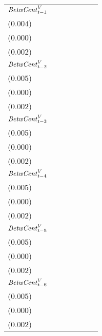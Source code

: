 \begin{tabular}{lllllll}
${\it BetwCent}^V_{t-1}$   &      \makecell{$0.001^{}$ \\ ($0.004$)} &     \makecell{$-0.000^{}$ \\ ($0.000$)} &   \makecell{$0.571^{***}$ \\ ($0.002$)} &                             \makecell{} &                             \makecell{} &                             \makecell{} \\
${\it BetwCent}^V_{t-2}$   &   \makecell{$-0.010^{**}$ \\ ($0.005$)} &      \makecell{$0.000^{}$ \\ ($0.000$)} &   \makecell{$0.208^{***}$ \\ ($0.002$)} &                             \makecell{} &                             \makecell{} &                             \makecell{} \\
${\it BetwCent}^V_{t-3}$   &   \makecell{$0.016^{***}$ \\ ($0.005$)} &   \makecell{$0.001^{***}$ \\ ($0.000$)} &   \makecell{$0.091^{***}$ \\ ($0.002$)} &                             \makecell{} &                             \makecell{} &                             \makecell{} \\
${\it BetwCent}^V_{t-4}$   &    \makecell{$0.010^{**}$ \\ ($0.005$)} &  \makecell{$-0.001^{***}$ \\ ($0.000$)} &   \makecell{$0.045^{***}$ \\ ($0.002$)} &                             \makecell{} &                             \makecell{} &                             \makecell{} \\
${\it BetwCent}^V_{t-5}$   &  \makecell{$-0.025^{***}$ \\ ($0.005$)} &    \makecell{$0.000^{**}$ \\ ($0.000$)} &     \makecell{$-0.001^{}$ \\ ($0.002$)} &                             \makecell{} &                             \makecell{} &                             \makecell{} \\
${\it BetwCent}^V_{t-6}$   &   \makecell{$0.014^{***}$ \\ ($0.005$)} &  \makecell{$-0.001^{***}$ \\ ($0.000$)} &      \makecell{$0.001^{}$ \\ ($0.002$)} &                             \makecell{} &                             \makecell{} &                             \makecell{} \\

\end{tabular}
